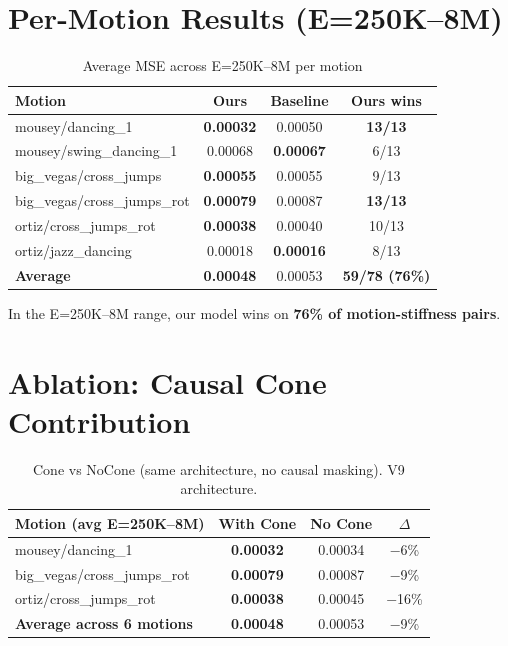 \documentclass[10pt]{article}
\begin{document}
\section{Per-Motion Results (E=250K--8M)}

\begin{table}[h]
\centering
\caption{Average MSE across E=250K--8M per motion}
\begin{tabular}{l|cc|c}
\toprule
\textbf{Motion} & \cellcolor{best}\textbf{Ours} & \textbf{Baseline} & \textbf{Ours wins} \\
\midrule
mousey/dancing\_1 & \cellcolor{best}\textbf{0.00032} & 0.00050 & \textbf{13/13} \\
mousey/swing\_dancing\_1 & 0.00068 & \cellcolor{best}\textbf{0.00067} & 6/13 \\
big\_vegas/cross\_jumps & \cellcolor{best}\textbf{0.00055} & 0.00055 & 9/13 \\
big\_vegas/cross\_jumps\_rot & \cellcolor{best}\textbf{0.00079} & 0.00087 & \textbf{13/13} \\
ortiz/cross\_jumps\_rot & \cellcolor{best}\textbf{0.00038} & 0.00040 & 10/13 \\
ortiz/jazz\_dancing & 0.00018 & \cellcolor{best}\textbf{0.00016} & 8/13 \\
\midrule
\textbf{Average} & \cellcolor{best}\textbf{0.00048} & 0.00053 & \textbf{59/78 (76\%)} \\
\bottomrule
\end{tabular}
\end{table}

In the E=250K--8M range, our model wins on \textbf{76\% of motion-stiffness pairs}.

\section{Ablation: Causal Cone Contribution}

\begin{table}[h]
\centering
\caption{Cone vs NoCone (same architecture, no causal masking). V9 architecture.}
\begin{tabular}{l|cc|c}
\toprule
\textbf{Motion (avg E=250K--8M)} & \textbf{With Cone} & \textbf{No Cone} & \textbf{$\Delta$} \\
\midrule
mousey/dancing\_1 & \textbf{0.00032} & 0.00034 & $-$6\% \\
big\_vegas/cross\_jumps\_rot & \textbf{0.00079} & 0.00087 & $-$9\% \\
ortiz/cross\_jumps\_rot & \textbf{0.00038} & 0.00045 & $-$16\% \\
\midrule
\textbf{Average across 6 motions} & \textbf{0.00048} & 0.00053 & $-$9\% \\
\bottomrule
\end{tabular}
\end{table}
\end{document}
